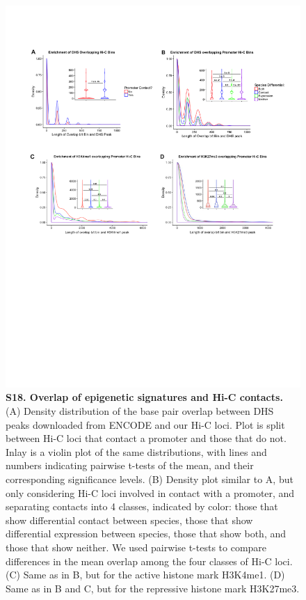 \begin{figure}[!htb]
\centering
\includegraphics[width=6in]{img/figS18.pdf}
\caption[Overlap of epigenetic signatures and Hi-C contacts.]{\textbf{S18. Overlap of epigenetic signatures and Hi-C contacts.} (A) Density distribution of the base pair overlap between DHS peaks downloaded from ENCODE and our Hi-C loci. Plot is split between Hi-C loci that contact a promoter and those that do not. Inlay is a violin plot of the same distributions, with lines and numbers indicating pairwise t-tests of the mean, and their corresponding significance levels. (B) Density plot similar to A, but only considering Hi-C loci involved in contact with a promoter, and separating contacts into 4 classes, indicated by color: those that show differential contact between species, those that show differential expression between species, those that show both, and those that show neither. We used pairwise t-tests to compare differences in the mean overlap among the four classes of Hi-C loci. (C) Same as in B, but for the active histone mark H3K4me1. (D) Same as in B and C, but for the repressive histone mark H3K27me3.}
\label{fig:figS18}
\end{figure}

